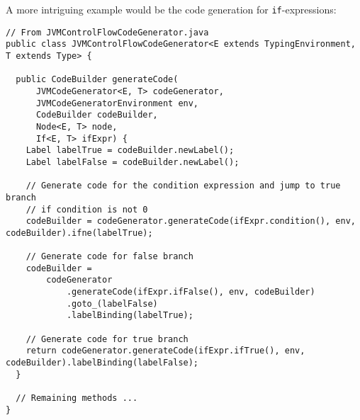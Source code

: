 A more intriguing example would be the code generation for \texttt{if}-expressions:

\begin{lstlisting}
// From JVMControlFlowCodeGenerator.java
public class JVMControlFlowCodeGenerator<E extends TypingEnvironment, T extends Type> {

  public CodeBuilder generateCode(
      JVMCodeGenerator<E, T> codeGenerator,
      JVMCodeGeneratorEnvironment env,
      CodeBuilder codeBuilder,
      Node<E, T> node,
      If<E, T> ifExpr) {
    Label labelTrue = codeBuilder.newLabel();
    Label labelFalse = codeBuilder.newLabel();

    // Generate code for the condition expression and jump to true branch
    // if condition is not 0
    codeBuilder = codeGenerator.generateCode(ifExpr.condition(), env, codeBuilder).ifne(labelTrue);

    // Generate code for false branch
    codeBuilder =
        codeGenerator
            .generateCode(ifExpr.ifFalse(), env, codeBuilder)
            .goto_(labelFalse)
            .labelBinding(labelTrue);

    // Generate code for true branch
    return codeGenerator.generateCode(ifExpr.ifTrue(), env, codeBuilder).labelBinding(labelFalse);
  }
 
  // Remaining methods ...
}
\end{lstlisting}
